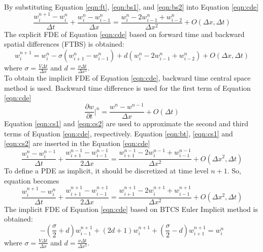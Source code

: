 \documentclass[letterpaper,12pt]{article}
\begin{document}
By substituting Equation \ref{eqn:ft}, \ref{eqn:bs1}, and \ref{eqn:bs2} into Equation \ref{eqn:cde}
\begin{equation}
	\frac{w_{i}^{n+1}-{w_{i}^{n}}}{\Delta t}+\frac{w_{i}^{n}-w_{i-1}^{n}}{\Delta x}
	=\frac{w_{i}^{n}-2w_{i-1}^{n}+w_{i-2}^{n}}{\Delta x^2}+O(\Delta x,\Delta t)
\end{equation}
The explicit FDE of Equation \ref{eqn:cde} based on forward time and backward spatial
differences (FTBS) is obtained:
\begin{equation}
	w_{i}^{n+1}= w_{i}^{n}-\sigma(w_{i+1}^{n}-w_{i-1}^{n})+d(w_{i}^{n}-2w_{i-1}^{n}+w_{i-2}^{n})+O(\Delta x,\Delta t)
\end{equation}
where $\sigma = \frac{V\Delta t}{\Delta x }$ and $d = \frac{\nu\Delta t}{\Delta x^2 }$.
\\ To obtain the implicit FDE of Equation \ref{eqn:cde}, backward time central space method is used.
Backward time difference is used for the first term of Equation \ref{eqn:cde}
\begin{equation}
	\frac{\partial w}{\partial t}\vert^{n}=\frac{w^{n}-w^{n-1}}{\Delta x}+O(\Delta t)
	\label{eqn:bt}
\end{equation}
Equation \ref{eqn:cs1} and \ref{eqn:cs2} are used to approximate the second and third
terms of Equation \ref{eqn:cde}, respectively. Equation \ref{eqn:bt}, \ref{eqn:cs1}
and \ref{eqn:cs2} are inserted in the Equation \ref{eqn:cde}
\begin{equation}
	\frac{w_{i}^{n}-{w_{i}^{n-1}}}{\Delta t}+\frac{w_{i+1}^{n-1}-w_{i-1}^{n-1}}{2\Delta x}
	=\frac{w_{i+1}^{n-1}-2w_{i}^{n-1}+w_{i-1}^{n-1}}{\Delta x^2}+O(\Delta x^2, \Delta t)
\end{equation}
To define a PDE as implicit, it should be discretized at time level $n+1$. So, equation becomes
\begin{equation}
	\frac{w_{i}^{n+1}-{w_{i}^{n}}}{\Delta t}+\frac{w_{i+1}^{n+1}-w_{i-1}^{n+1}}{2\Delta x}
	=\frac{w_{i+1}^{n+1}-2w_{i}^{n+1}+w_{i-1}^{n+1}}{\Delta x^2}+O(\Delta x^2, \Delta t)	
\end{equation}
The implicit FDE of Equation \ref{eqn:cde} based on BTCS Euler Implicit method is obtained:
\begin{equation}
	-(\frac{\sigma}{2}+d)w_{i-1}^{n+1}+(2d+1)w_{i}^{n+1}+(\frac{\sigma}{2}-d)w_{i+1}^{n+1} = w_{i}^{n}
	\label{eqn:implicit}
\end{equation}
where $\sigma = \frac{V\Delta t}{\Delta x }$ and $d = \frac{\nu\Delta t}{\Delta x^2 }$.
\newpage
\end{document}
